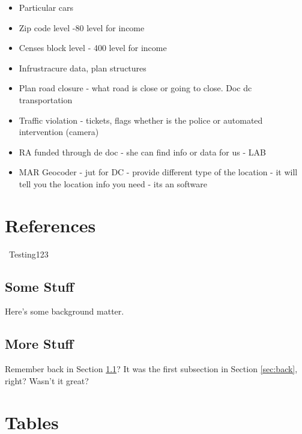 \documentclass[12pt]{article}
\begin{document}
\begin{singlespacing}
\begin{itemize}
\item Particular cars
\item Zip code level -80 level for income
\item Censes block level - 400 level for income
\item Infrustracure data, plan structures
\item Plan road closure - what road is close or going to close. Doc dc transportation 
\item Traffic violation - tickets, flags whether is the police or automated intervention (camera) 
\item RA funded through de doc - she can find info or data for us - LAB
\item MAR Geocoder - jut for DC - provide different type of the location - it will tell you the location info you need - its an software 

\end{itemize}
\end{singlespacing}

\section{References}
\label{sec:Ref}

\maketitle
 \ Testing123 \cite{HAYAKAWA2000827}





\subsection{Some Stuff}
\label{sub:some}

Here's some background matter.

\subsection{More Stuff}
Remember back in Section \ref{sub:some}?  It was the first subsection in Section \ref{sec:back}, right?  Wasn't it great?

\section{Tables}
\end{document}
